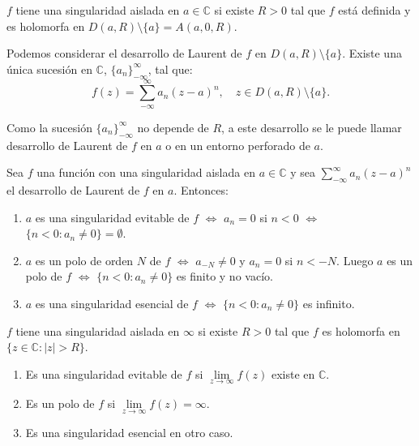 \begin{definition}
    $f$ tiene una singularidad aislada en $a \in \mathbb{C}$ si existe $R > 0$ tal que $f$ está definida y es holomorfa en $D(a, R) \setminus \{a\} = A(a, 0, R)$.
\end{definition}

Podemos considerar el desarrollo de Laurent de $f$ en $D(a, R) \setminus \{a\}$.
Existe una única sucesión en $\mathbb{C}$, $\{a_n\}_{-\infty}^\infty$, tal que:
$$f(z) = \sum_{-\infty}^\infty a_n(z-a)^n, \quad z \in D(a, R) \setminus \{a\}.$$

Como la sucesión $\{a_n\}_{-\infty}^\infty$ no depende de $R$, a este desarrollo se le puede llamar desarrollo de Laurent de $f$ en $a$ o en un entorno perforado de $a$.

\begin{proposition}
    Sea $f$ una función con una singularidad aislada en $a \in \mathbb{C}$ y sea $\sum_{-\infty}^\infty a_n(z-a)^n$ el desarrollo de Laurent de $f$ en $a$.
    Entonces:
    \begin{enumerate}
        \item $a$ es una singularidad evitable de $f$ $\Leftrightarrow$ $a_n = 0$ si $n < 0$ $\Leftrightarrow$ $\{n < 0 : a_n \neq 0\} = \emptyset$.
        \item $a$ es un polo de orden $N$ de $f$ $\Leftrightarrow$ $a_{-N} \neq 0$ y $a_n = 0$ si $n < -N$.
              Luego $a$ es un polo de $f$ $\Leftrightarrow$ $\{n < 0 : a_n \neq 0\}$ es finito y no vacío.
        \item $a$ es una singularidad esencial de $f$ $\Leftrightarrow$ $\{n < 0 : a_n \neq 0\}$ es infinito.
    \end{enumerate}
\end{proposition}

\begin{definition}
    $f$ tiene una singularidad aislada en $\infty$ si existe $R > 0$ tal que $f$ es holomorfa en $\{z \in \mathbb{C} : |z| > R\}$.
    \begin{enumerate}
        \item Es una singularidad evitable de $f$ si $\lim\limits_{z \to \infty} f(z)$ existe en $\mathbb{C}$.
        \item Es un polo de $f$ si $\lim\limits_{z \to \infty} f(z) = \infty$.
        \item Es una singularidad esencial en otro caso.
    \end{enumerate}
\end{definition}

